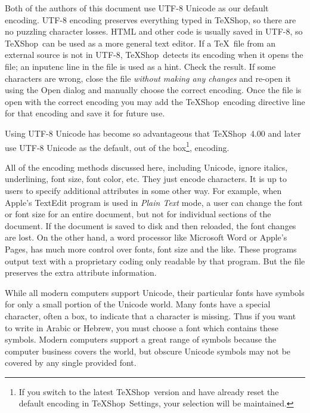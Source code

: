 \documentclass[letterpaper,11pt]{article}
\newcommand{\TS}{\textsf{\TeX Shop}}
\newcommand{\acr}[1]{\textsf{#1}}
\newcommand{\cmd}[1]{\textsf{#1}}
\begin{document}
Both of the authors of this document use \acr{UTF-8 Unicode} as our default encoding. \acr{UTF-8} encoding preserves everything typed in \TS, so there are no puzzling character losses. HTML and other code is usually saved in \acr{UTF-8}, so \TS\ can be used as a more general text editor. If a \TeX\ file from an external source is not in \acr{UTF-8}, \TS\ detects its encoding when it opens the file; an \cmd{inputenc} line in the file is used as a hint. Check the result. If some characters are wrong, close the file \emph{without making any changes} and re-open it using the \cmd{Open} dialog and manually choose the correct encoding. Once the file is open with the correct encoding you may add the \TS\ encoding directive line for that encoding and save it for future use.

Using \acr{UTF-8 Unicode} has become so advantageous that \TS\ 4.00 and later use \acr{UTF-8 Unicode} as the default, out of the box\footnote{If you switch to the latest \TS\ version and have already reset the default encoding in \TS\ Settings, your selection will be maintained.}, encoding.

All of the encoding methods discussed here, including \cmd{Unicode}, ignore italics, underlining, font size, font color, etc. They just encode characters. It is up to users to specify additional attributes in some other way. For example, when Apple's \cmd{TextEdit} program is used in \emph{Plain Text} mode, a user can change the font or font size for an entire document, but not for individual sections of the document. If the document is saved to disk and then reloaded, the font changes are lost. On the other hand, a word processor like Microsoft Word or Apple's Pages, has much more control over fonts, font size and the like. These programs output text with a proprietary coding only readable by that program. But the file preserves the extra attribute information.  

While all modern computers support \acr{Unicode}, their particular fonts have symbols for only a small portion of the \acr{Unicode} world. Many fonts have a special character, often a box, to
indicate that a character is missing. Thus if you want to write in Arabic or Hebrew, you must choose a font which contains these symbols. Modern computers support a great range of symbols because the computer business covers the world, but obscure \acr{Unicode} symbols may not be covered by any single provided font.
\end{document}
